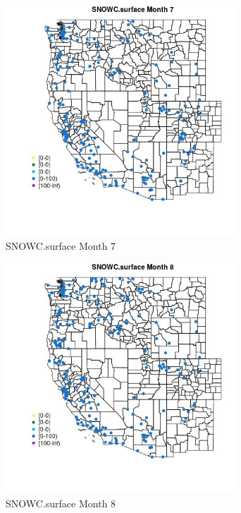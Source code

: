 \begin{figure} 
\centering  
\includegraphics[width=0.77\textwidth]{Code_Outputs/Report_ML_input_PM25_Step4_part_e_de_duplicated_aveswNAs_MapObsMo7SNOWCsurface.jpg} 
\caption{\label{fig:Report_ML_input_PM25_Step4_part_e_de_duplicated_aveswNAsMapObsMo7SNOWCsurface}SNOWC.surface Month 7} 
\end{figure} 
 

\begin{figure} 
\centering  
\includegraphics[width=0.77\textwidth]{Code_Outputs/Report_ML_input_PM25_Step4_part_e_de_duplicated_aveswNAs_MapObsMo8SNOWCsurface.jpg} 
\caption{\label{fig:Report_ML_input_PM25_Step4_part_e_de_duplicated_aveswNAsMapObsMo8SNOWCsurface}SNOWC.surface Month 8} 
\end{figure} 
 

